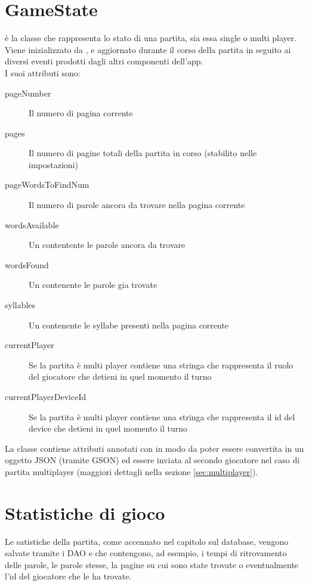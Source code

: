 \section{GameState}
\label{sec:game_state}
 è la classe che rappresenta lo stato di una partita, sia essa single o multi player. Viene inizializzato da , e aggiornato durante il corso della partita in seguito ai diversi eventi prodotti dagli altri componenti dell'app.\\
I suoi attributi sono:
\begin{description}
    \item[pageNumber] Il numero di pagina corrente
    \item[pages] Il numero di pagine totali della partita in corso (stabilito nelle impostazioni)
    \item[pageWordsToFindNum] Il numero di parole ancora da trovare nella pagina corrente
    \item[wordsAvailable] Un  contentente le parole ancora da trovare
    \item[wordsFound] Un  contenente le parole gia trovate
    \item[syllables] Un  contenente le syllabe presenti nella pagina corrente
    \item[currentPlayer] Se la partita è multi player contiene una stringa che rappresenta il ruolo del giocatore che detieni in quel momento il turno
    \item[currentPlayerDeviceId] Se la partita è multi player contiene una stringa che rappresenta il id del device che detieni in quel momento il turno
\end{description}

La classe  contiene attributi annotati con  in modo da poter essere convertita in un oggetto JSON (tramite GSON) ed essere inviata al secondo giocatore nel caso di partita multiplayer (maggiori dettagli nella sezione \ref{sec:multiplayer}).

\section{Statistiche di gioco}
\label{sec:stats}
Le satistiche della partita, come accennato nel capitolo sul database, vengono salvate tramite i DAO  e  che contengono, ad esempio, i tempi di ritrovamento delle parole, le parole stesse, la pagine su cui sono state trovate o eventualmente l'id del giocatore che le ha trovate.

